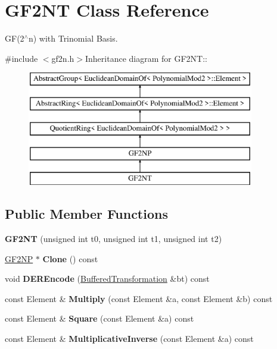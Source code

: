 \hypertarget{class_g_f2_n_t}{
\section{GF2NT Class Reference}
\label{class_g_f2_n_t}
}


GF(2$^\wedge$n) with Trinomial Basis.  


{\ttfamily \#include $<$gf2n.h$>$}Inheritance diagram for GF2NT::\begin{figure}[H]
\begin{center}
\leavevmode
\includegraphics[height=5cm]{class_g_f2_n_t}
\end{center}
\end{figure}
\subsection*{Public Member Functions}
\begin{DoxyCompactItemize}
\item 
\hypertarget{class_g_f2_n_t_a87782597d6454b42c7f744456a22580a}{
{\bfseries GF2NT} (unsigned int t0, unsigned int t1, unsigned int t2)}
\label{class_g_f2_n_t_a87782597d6454b42c7f744456a22580a}

\item 
\hypertarget{class_g_f2_n_t_a77fde8415be0fee43c1c25c7fc54d553}{
\hyperlink{class_g_f2_n_p}{GF2NP} $\ast$ {\bfseries Clone} () const }
\label{class_g_f2_n_t_a77fde8415be0fee43c1c25c7fc54d553}

\item 
\hypertarget{class_g_f2_n_t_af50c3ef51ccaac6e4560d7373b985591}{
void {\bfseries DEREncode} (\hyperlink{class_buffered_transformation}{BufferedTransformation} \&bt) const }
\label{class_g_f2_n_t_af50c3ef51ccaac6e4560d7373b985591}

\item 
\hypertarget{class_g_f2_n_t_ad1abfff1a18dfa5178125a96b354916f}{
const Element \& {\bfseries Multiply} (const Element \&a, const Element \&b) const }
\label{class_g_f2_n_t_ad1abfff1a18dfa5178125a96b354916f}

\item 
\hypertarget{class_g_f2_n_t_a0a97afdc31def30b42ab35ac3439a67c}{
const Element \& {\bfseries Square} (const Element \&a) const }
\label{class_g_f2_n_t_a0a97afdc31def30b42ab35ac3439a67c}

\item 
\hypertarget{class_g_f2_n_t_ac6233146b3e70e0c4995cd9887242368}{
const Element \& {\bfseries MultiplicativeInverse} (const Element \&a) const }
\label{class_g_f2_n_t_ac6233146b3e70e0c4995cd9887242368}

\end{DoxyCompactItemize}


